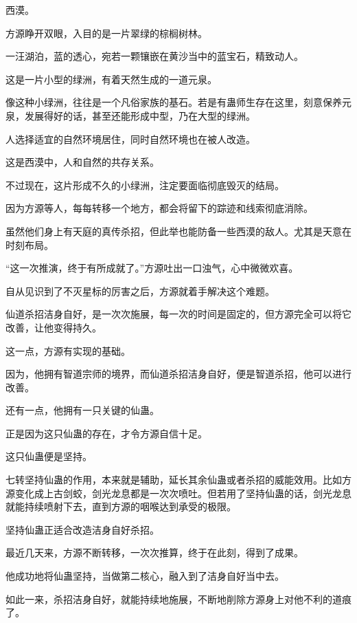 
\begin{this_body}

西漠。

方源睁开双眼，入目的是一片翠绿的棕榈树林。

一汪湖泊，蓝的透心，宛若一颗镶嵌在黄沙当中的蓝宝石，精致动人。

这是一片小型的绿洲，有着天然生成的一道元泉。

像这种小绿洲，往往是一个凡俗家族的基石。若是有蛊师生存在这里，刻意保养元泉，发展得好的话，甚至还能形成中型，乃在大型的绿洲。

人选择适宜的自然环境居住，同时自然环境也在被人改造。

这是西漠中，人和自然的共存关系。

不过现在，这片形成不久的小绿洲，注定要面临彻底毁灭的结局。

因为方源等人，每每转移一个地方，都会将留下的踪迹和线索彻底消除。

虽然他们身上有天庭的真传杀招，但此举也能防备一些西漠的敌人。尤其是天意在时刻布局。

“这一次推演，终于有所成就了。”方源吐出一口浊气，心中微微欢喜。

自从见识到了不灭星标的厉害之后，方源就着手解决这个难题。

仙道杀招洁身自好，是一次次施展，每一次的时间是固定的，但方源完全可以将它改善，让他变得持久。

这一点，方源有实现的基础。

因为，他拥有智道宗师的境界，而仙道杀招洁身自好，便是智道杀招，他可以进行改善。

还有一点，他拥有一只关键的仙蛊。

正是因为这只仙蛊的存在，才令方源自信十足。

这只仙蛊便是坚持。

七转坚持仙蛊的作用，本来就是辅助，延长其余仙蛊或者杀招的威能效用。比如方源变化成上古剑蛟，剑光龙息都是一次次喷吐。但若用了坚持仙蛊的话，剑光龙息就能持续喷射下去，直到方源的咽喉达到承受的极限。

坚持仙蛊正适合改造洁身自好杀招。

最近几天来，方源不断转移，一次次推算，终于在此刻，得到了成果。

他成功地将仙蛊坚持，当做第二核心，融入到了洁身自好当中去。

如此一来，杀招洁身自好，就能持续地施展，不断地削除方源身上对他不利的道痕了。


\end{this_body}
